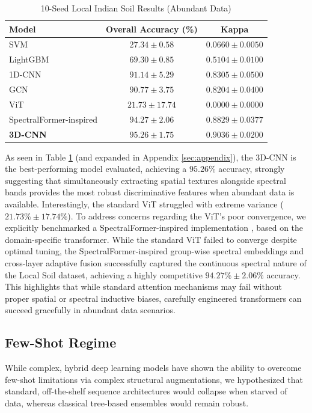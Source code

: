 \documentclass[pdflatex,sn-mathphys-num,iicol]{sn-jnl}
\begin{document}
\begin{table}[t]
\centering
\caption{10-Seed Local Indian Soil Results (Abundant Data)}\label{tab:local_soil}
\begin{tabular}{lcc}
\toprule
\textbf{Model} & \textbf{Overall Accuracy (\%)} & \textbf{Kappa} \\
\midrule
SVM & $27.34 \pm 0.58$ & $0.0660 \pm 0.0050$ \\
LightGBM & $69.30 \pm 0.85$ & $0.5104 \pm 0.0100$ \\
1D-CNN & $91.14 \pm 5.29$ & $0.8305 \pm 0.0500$ \\
GCN & $90.77 \pm 3.75$ & $0.8204 \pm 0.0400$ \\
ViT & $21.73 \pm 17.74$ & $0.0000 \pm 0.0000$ \\
SpectralFormer-inspired & $94.27 \pm 2.06$ & $0.8829 \pm 0.0377$ \\
\textbf{3D-CNN} & $\mathbf{95.26 \pm 1.75}$ & $\mathbf{0.9036 \pm 0.0200}$ \\
\bottomrule
\end{tabular}
\end{table}

As seen in Table \ref{tab:local_soil} (and expanded in Appendix \ref{sec:appendix}), the 3D-CNN is the best-performing model evaluated, achieving a $95.26\%$ accuracy, strongly suggesting that simultaneously extracting spatial textures alongside spectral bands provides the most robust discriminative features when abundant data is available. Interestingly, the standard ViT struggled with extreme variance ($21.73\% \pm 17.74\%$). To address concerns regarding the ViT's poor convergence, we explicitly benchmarked a SpectralFormer-inspired implementation \cite{b8}, based on the domain-specific transformer. While the standard ViT failed to converge despite optimal tuning, the SpectralFormer-inspired group-wise spectral embeddings and cross-layer adaptive fusion successfully captured the continuous spectral nature of the Local Soil dataset, achieving a highly competitive $94.27\% \pm 2.06\%$ accuracy. This highlights that while standard attention mechanisms may fail without proper spatial or spectral inductive biases, carefully engineered transformers can succeed gracefully in abundant data scenarios.

\subsection{Few-Shot Regime}
While complex, hybrid deep learning models have shown the ability to overcome few-shot limitations via complex structural augmentations, we hypothesized that standard, off-the-shelf sequence architectures would collapse when starved of data, whereas classical tree-based ensembles would remain robust.
\end{document}
